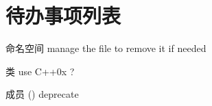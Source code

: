 \chapter{待办事项列表}
\hypertarget{todo}{}\label{todo}

\begin{DoxyRefList}
\item[命名空间 \doxylink{namespace_f_mem_utils}{FMem\+Utils} ]\label{todo__todo000005}%
%
manage the file to remove it if needed  
\item[类 \doxylink{class_f_no_copyable}{FNo\+Copyable} ]\label{todo__todo000006}%
%
use C++0x ?  
\item[成员 \doxylink{class_f_tic_ade3afdb1aa198635ebbc5ee8b7f4f081}{FTic\+::tac\+And\+Elapsed} ()]\label{todo__todo000007}%
%
deprecate 
\end{DoxyRefList}